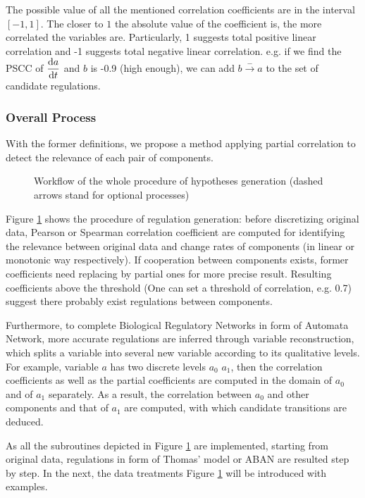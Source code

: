 The possible value of all the mentioned correlation coefficients are in the interval $[-1,1]$.
The closer to $1$ the absolute value of the coefficient is, the more correlated the variables are.
Particularly, 1 suggests total positive linear correlation and -1 suggests total negative linear correlation. 
e.g. if we find the PSCC of $\dfrac{{\rm d}a}{{\rm d}t}$ and $b$ is -0.9 (high enough), we can add $b\xrightarrow{-}a$ to the set of candidate regulations.

\subsubsection{Overall Process}

With the former definitions, we propose a method applying partial correlation to detect the relevance of each pair of components.

\begin{figure}[ht]

\caption[Workflow of model inference via partial correlation]{Workflow of the whole procedure of hypotheses generation (dashed arrows stand for optional processes)}\label{plan}
\end{figure}
Figure \ref{plan} shows the procedure of regulation generation: before discretizing original data, Pearson or Spearman correlation coefficient \cite{samaga2009logic,hauke2011comparison} are computed for identifying the relevance between original data and change rates of components (in linear or monotonic way respectively). If cooperation between components exists, former coefficients need replacing by partial ones \cite{de2004discovery} for more precise result.
Resulting coefficients above the threshold (One can set a threshold of correlation, e.g. 0.7) suggest there probably exist regulations between components.

Furthermore, to complete Biological Regulatory Networks in form of Automata Network, more accurate regulations are inferred through variable reconstruction, which splits a variable into several new variable according to its qualitative levels.
For example, variable $a$ has two discrete levels $a_0$ $a_1$, then the correlation coefficients as well as the partial coefficients are computed in the domain of $a_0$ and of $a_1$ separately.
As a result, the correlation between $a_0$ and other components and that of $a_1$ are computed, with which candidate transitions are deduced.

As all the subroutines depicted in Figure \ref{plan} are implemented, starting from original data, regulations in form of Thomas' model or ABAN are resulted step by step. In the next, the data treatments Figure \ref{plan} will be introduced with examples.

